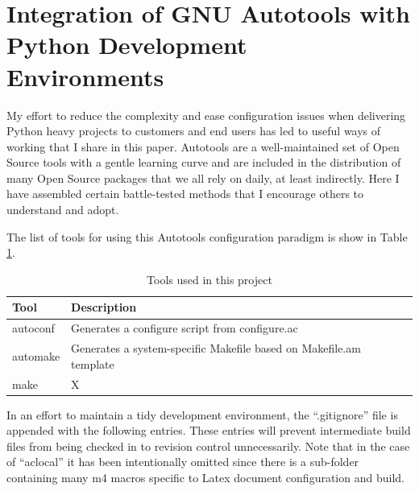 






\section{\label{sec:Start}Integration of GNU Autotools with Python Development Environments}
\vspace{2mm}
\justifying
My effort to reduce the complexity and ease configuration issues when delivering Python heavy projects to customers and end
users has led to useful ways of working that I share in this paper. Autotools are a well-maintained set of Open Source tools
with a gentle learning curve and are included in the distribution of many Open Source packages that we all rely on daily, at
least indirectly. Here I have assembled certain battle-tested methods that I encourage others to understand and adopt.
\vspace{2mm}

\justifying
The list of tools for using this Autotools configuration paradigm is show in Table \ref{Autotools}.
\vspace{2mm}

\begin{table}[ht]
    \centering
    \begin{tabular}{|l|l|}\hline
        Tool & Description \\\hline
        autoconf & Generates a configure script from configure.ac   \\\hline
        automake & Generates a system-specific Makefile based on Makefile.am template    \\\hline
        make  &   X    \\\hline
    \end{tabular}
    \caption{Tools used in this project}
    \label{Autotools}
\end{table}
\vspace{2mm}


\justifying
In an effort to maintain a tidy development environment, the ``.gitignore'' file is appended with the following entries. These
entries will prevent intermediate build files from being checked in to revision control unnecessarily. Note that in the case
of ``aclocal'' it has been intentionally omitted since there is a sub-folder containing many m4 macros specific to Latex
document configuration and build.

